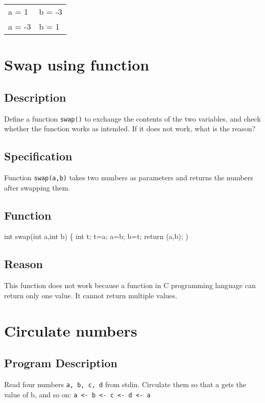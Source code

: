 \documentclass[11pt]{article}
\begin{document}
\begin{center}
\begin{tabular}{ll}
a = 1 & b = -3\\
a = -3 & b = 1\\
\end{tabular}
\end{center}

\section{Swap using function}
\label{sec-8}
\subsection*{Description}
\label{sec-8-1}
Define a function \texttt{swap()} to exchange the contents of the two variables, and check whether the function works as intended. If it does not work,
what is the reason?

\subsection*{Specification}
\label{sec-8-2}
Function \texttt{swap(a,b)} takes two numbers as parameters and returns the numbers after swapping them.

\subsection*{Function}
\label{sec-8-3}
int swap(int a,int b)
\{
   int t;
   t=a;
   a=b;
   b=t;
   return (a,b);
)

\subsection*{Reason}
\label{sec-8-4}
This function does not work because a function in C programming language can return only one value. It cannot return multiple values.

\section{Circulate numbers}
\label{sec-9}

\subsection*{Program Description}
\label{sec-9-1}
Read four numbers \texttt{a, b, c, d} from stdin. Circulate them so that a gets the value of b, and so on: \texttt{a <- b <- c <- d <- a}
\end{document}
